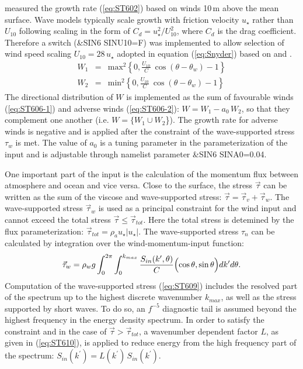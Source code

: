 \citet{art:DBYB06} measured the growth rate (\ref{eq:ST602}) 
based on winds 10\,m above the mean surface. Wave models typically
scale growth with friction velocity $u_\star$ rather than $U_{10}$
following scaling in the form of $C_d=u^2_\star/U^2_{10}$, 
where $C_d$ is the drag coefficient. Therefore a switch 
({\code \&SIN6 SINU10=F}) was implemented to allow selection of 
wind speed scaling $U_{10} = 28\,u_{\star}$ adopted in 
equation (\ref{eq:Snyder}) based on \citet{art:Sea81} and \citet{art:KHH84}. 
\begin{eqnarray}
W_1 & = & \mathrm{max}^2 \left \{ 0,\frac{U_{10}}{C}\ \cos(\theta-\theta_w)-1 \right \} \label{eq:ST606-1} \\
W_2 & = & \mathrm{min}^2 \left \{ 0,\frac{U_{10}}{C}\ \cos(\theta-\theta_w)-1 \right \} \label{eq:ST606-2} 
\end{eqnarray}
The directional distribution of $W$ is 
implemented as the sum of favourable winds (\ref{eq:ST606-1}) 
and adverse winds (\ref{eq:ST606-2}): $W=W_1-a_0\,W_2$, so 
that they complement one another (i.e. $W=\{W_1\cup W_2$\}). 
The growth rate for adverse winds is negative \citep{art:DBYB06}
and is applied after the constraint of the wave-supported stress 
$\tau_w$ is met. The value of $a_0$ is a tuning parameter 
in the parameterization of the input and is adjustable 
through namelist parameter {\code \&SIN6 SINA0=0.04}.

One important part of the input is the calculation of the momentum 
flux between atmosphere and ocean and vice versa. Close to the 
surface, the stress $\vec{\tau}$ can be written as the sum of 
the viscose and wave-supported stress:
$\vec{\tau} = \vec{\tau}_{v} + \vec{\tau}_{w}$. The wave-supported 
stress $ \vec{\tau}_{w}$ is used as a principal constraint for the 
wind input and cannot exceed the total stress $\vec{\tau} \le \vec{\tau}_{tot}$.
Here the total stress is detemined by the flux parameterization: 
$\vec{\tau}_{tot}=\rho_a u_\star|u_\star|$. The wave-supported 
stress $\tau_n$ can be calculated by integration over the
wind-momentum-input function:
\begin{equation}\label{eq:ST609}
   \vec{\tau}_w = \rho_w g \int_{0}^{2\pi} \int_{0}^{k_{max}} \frac{S_{in}(k^\prime,\theta)}{C} \Bigl (\cos\theta,\sin\theta \Bigr ) dk^\prime d\theta. 
\end{equation}
Computation of the wave-supported stress (\ref{eq:ST609}) includes the 
resolved part of the spectrum up to the highest discrete wavenumber $k_{max}$, 
as well as the stress supported by short waves. To do so, an $f^{-5}$ 
diagnostic tail is assumed beyond the highest frequency in the energy
density spectrum. In order to satisfy the constraint and in the 
case of $\vec{\tau} > \vec{\tau}_{tot}$, a wavenumber dependent factor 
$L$, as given in (\ref{eq:ST610}), is applied to reduce energy from 
the high frequency part of the spectrum: $S_{in}(k^\prime)=L(k^\prime)\,S_{in}(k^\prime)$.

